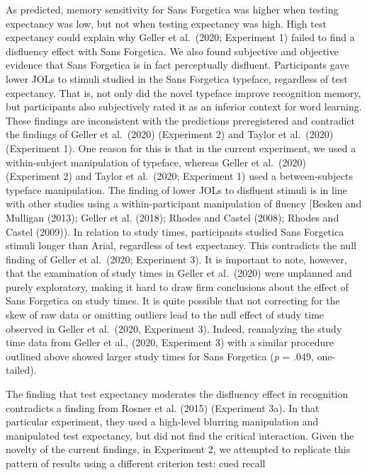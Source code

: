 \documentclass[
  english,
  jou]{apa7}
\begin{document}
As predicted, memory sensitivity for Sans Forgetica was higher when testing expectancy was low, but not when testing expectancy was high. High test expectancy could explain why Geller et al.~(2020; Experiment 1) failed to find a disfluency effect with Sans Forgetica. We also found subjective and objective evidence that Sans Forgetica is in fact perceptually disfluent. Participants gave lower JOLs to stimuli studied in the Sans Forgetica typeface, regardless of test expectancy. That is, not only did the novel typeface improve recognition memory, but participants also subjectively rated it as an inferior context for word learning. These findings are inconsistent with the predictions preregistered and contradict the findings of Geller et al.~(2020) (Experiment 2) and Taylor et al.~(2020) (Experiment 1). One reason for this is that in the current experiment, we used a within-subject manipulation of typeface, whereas Geller et al.~(2020) (Experiment 2) and Taylor et al.~(2020; Experiment 1) used a between-subjects typeface manipulation. The finding of lower JOLs to disfluent stimuli is in line with other studies using a within-participant manipulation of fluency {[}Besken and Mulligan (2013); Geller et al. (2018); Rhodes and Castel (2008); Rhodes and Castel (2009)). In relation to study times, participants studied Sans Forgetica stimuli longer than Arial, regardless of test expectancy. This contradicts the null finding of Geller et al.~(2020; Experiment 3). It is important to note, however, that the examination of study times in Geller et al.~(2020) were unplanned and purely exploratory, making it hard to draw firm conclusions about the effect of Sans Forgetica on study times. It is quite possible that not correcting for the skew of raw data or omitting outliers lead to the null effect of study time observed in Geller et al.~(2020, Experiment 3). Indeed, reanalyzing the study time data from Geller et al., (2020, Experiment 3) with a similar procedure outlined above showed larger study times for Sans Forgetica (\emph{p} = .049, one-tailed).

The finding that test expectancy moderates the disfluency effect in recognition contradicts a finding from Rosner et al. (2015) (Experiment 3a). In that particular experiment, they used a high-level blurring manipulation and manipulated test expectancy, but did not find the critical interaction. Given the novelty of the current findings, in Experiment 2, we attempted to replicate this pattern of results using a different criterion test: cued recall
\end{document}
